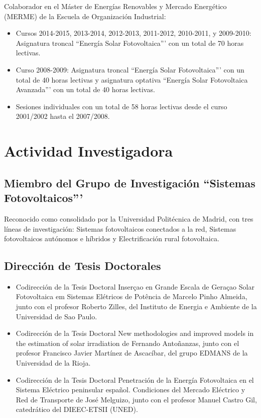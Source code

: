 \documentclass[article, a4paper]{memoir}
\begin{document}
Colaborador en el Máster de Energías Renovables y Mercado Energético (MERME) de la Escuela de Organización Industrial:

\begin{itemize}
\item Cursos 2014-2015, 2013-2014, 2012-2013, 2011-2012, 2010-2011, y 2009-2010: Asignatura troncal ``Energía Solar Fotovoltaica''' con un total de 70 horas lectivas.

\item Curso 2008-2009: Asignatura troncal ``Energía Solar Fotovoltaica''' con un total de 40 horas lectivas y asignatura optativa ``Energía Solar Fotovoltaica Avanzada''' con un total de 40 horas lectivas.

\item Sesiones individuales con un total de 58 horas lectivas desde el curso 2001/2002 hasta el 2007/2008.
\end{itemize}


\section{Actividad Investigadora}
\label{sec-5}

\subsection{Miembro del Grupo de Investigación ``Sistemas Fotovoltaicos'''}
\label{sec-5-1}

Reconocido como consolidado por la Universidad Politécnica de Madrid, con tres líneas de investigación: Sistemas fotovoltaicos conectados a la red, Sistemas fotovoltaicos autónomos e híbridos y Electrificación rural fotovoltaica.

\subsection{Dirección de Tesis Doctorales}
\label{sec-5-2}

\begin{itemize}
\item Codirección de la Tesis Doctoral \guillemotleft{}Inserçao en Grande Escala de Geraçao Solar Fotovoltaica em Sistemas Elétricos de Potência\guillemotright{} de Marcelo Pinho Almeida, junto con el profesor Roberto Zilles, del Instituto de Energia e Ambiente de la Universidad de Sao Paulo.

\item Codirección de la Tesis Doctoral \guillemotleft{}New methodologies and improved models in the estimation of solar irradiation\guillemotright{} de Fernando Antoñanzas, junto con el profesor Francisco Javier Martínez de Ascacíbar, del grupo EDMANS de la Universidad de la Rioja.

\item Codirección de la Tesis Doctoral \guillemotleft{}Penetración de la Energía Fotovoltaica en el Sistema Eléctrico peninsular español. Condiciones del Mercado Eléctrico y Red de Transporte\guillemotright{} de José Melguizo, junto con el profesor Manuel Castro Gil, catedrático del DIEEC-ETSII (UNED).
\end{itemize}
\end{document}
